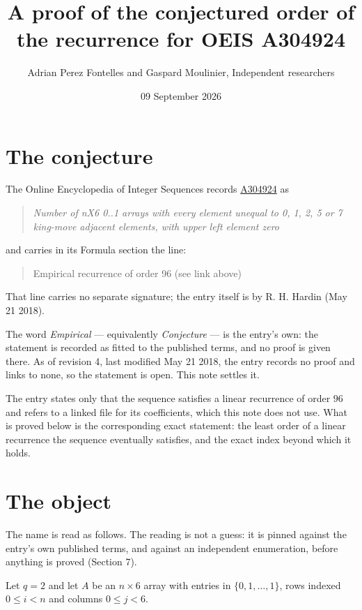 \documentclass[11pt]{article}
\title{A proof of the conjectured order of the recurrence for OEIS A304924}
\author{Adrian Perez Fontelles and Gaspard Moulinier, Independent researchers}
\date{09 September 2026}
\theoremstyle{definition}
\begin{document}
\maketitle
\section{The conjecture}

The Online Encyclopedia of Integer Sequences records \href{https://oeis.org/A304924}{A304924} as

\begin{quote}\itshape Number of nX6 0..1 arrays with every element unequal to 0, 1, 2, 5 or 7 king-move adjacent elements, with upper left element zero\end{quote}

and carries in its Formula section the line:

\begin{quote}\ttfamily Empirical recurrence of order 96 (see link above)\end{quote}

That line carries no separate signature; the entry itself is by R. H. Hardin (May 21 2018).

The word {\itshape Empirical} --- equivalently {\itshape Conjecture} --- is the entry's own: the statement is recorded as fitted to the published terms, and no proof is given there. As of revision 4, last modified May 21 2018, the entry records no proof and links to none, so the statement is open. This note settles it.

The entry states only that the sequence satisfies a linear recurrence of order $96$ and refers to a linked file for its coefficients, which this note does not use. What is proved below is the corresponding exact statement: the least order of a linear recurrence the sequence eventually satisfies, and the exact index beyond which it holds.

\section{The object}

The name is read as follows. The reading is not a guess: it is pinned against the entry's own published terms, and against an independent enumeration, before anything is proved (Section 7).

Let $q = 2$ and let $A$ be an $n \times 6$ array with entries in $\{0,1,\dots,1\}$, rows indexed $0 \le i < n$ and columns $0 \le j < 6$.
\end{document}
